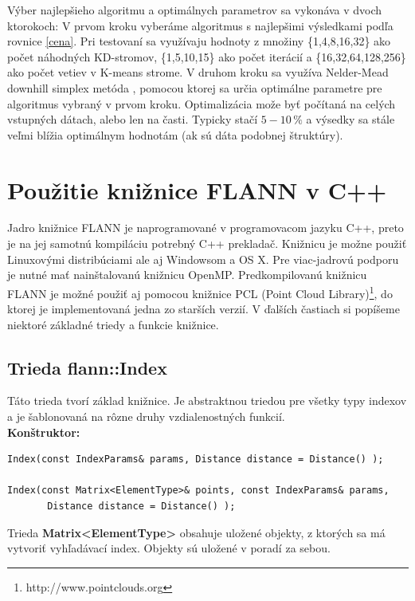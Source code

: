 \documentclass[12pt,oneside]{fithesis2}
\begin{document}
Výber najlepšieho algoritmu a optimálnych parametrov sa vykonáva v dvoch ktorokoch: V prvom kroku vyberáme algoritmus s najlepšimi výsledkami podľa rovnice \ref{cena}. Pri testovaní sa využívaju hodnoty z množiny \{1,4,8,16,32\} ako počet náhodných KD-stromov, \{1,5,10,15\} ako počet iterácií a \{16,32,64,128,256\} ako počet vetiev v K-means strome. V druhom kroku sa využíva Nelder-Mead downhill simplex metóda \cite{NelderMead65}, pomocou ktorej sa určia optimálne parametre pre algoritmus vybraný v prvom kroku. Optimalizácia može byť počítaná na celých vstupných dátach, alebo len na časti. Typicky stačí $5-10\,\%$ a výsedky sa stále veľmi blížia optimálnym hodnotám (ak sú dáta podobnej štruktúry). \cite{muja_flann_2009} 

	\section{Použitie knižnice FLANN v C++}
	Jadro knižnice FLANN je naprogramované v programovacom jazyku C++, preto je na jej samotnú kompiláciu potrebný C++ prekladač. Knižnicu je možne použiť Linuxovými distribúciami ale aj Windowsom a OS X. Pre viac-jadrovú podporu je nutné mať nainštalovanú knižnicu OpenMP. Predkompilovanú knižnicu FLANN je  možné použiť aj pomocou knižnice PCL (Point Cloud Library)\footnote{http://www.pointclouds.org}, do ktorej je implementovaná jedna zo starších verzií. V ďalších častiach si popíšeme niektoré základné triedy a funkcie knižnice. \cite{manual}
	
	\subsection{Trieda flann::Index}  
	Táto trieda tvorí základ knižnice. Je abstraktnou triedou pre všetky typy indexov a je šablonovaná na rôzne druhy vzdialenostných funkcií. \cite{manual}\\
\textbf{Konštruktor:}

{\scriptsize	
\begin{lstlisting}[frame=single]  
Index(const IndexParams& params, Distance distance = Distance() );

Index(const Matrix<ElementType>& points, const IndexParams& params,
       Distance distance = Distance() );
\end{lstlisting}}
Trieda \textbf{Matrix<ElementType>} obsahuje uložené objekty, z ktorých sa má vytvoriť vyhľadávací index. Objekty sú uložené v poradí za sebou. \cite{manual}
\end{document}
